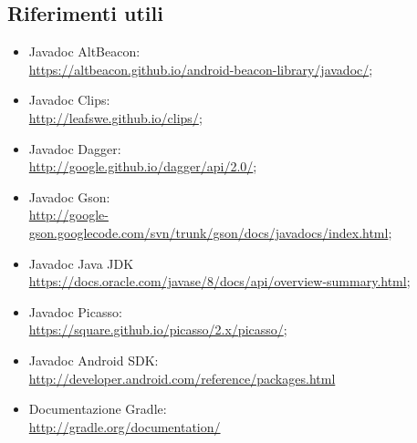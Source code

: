 \documentclass[../ManualeSviluppatore.tex]{subfiles}
\begin{document}
	
	\subsection{Riferimenti utili}
		\begin{itemize}
			\item Javadoc AltBeacon: \\ \url{https://altbeacon.github.io/android-beacon-library/javadoc/};
			\item Javadoc Clips: \\ \url{http://leafswe.github.io/clips/};
			\item Javadoc Dagger: \\ \url{http://google.github.io/dagger/api/2.0/};
			\item Javadoc Gson: \\ \url{http://google-gson.googlecode.com/svn/trunk/gson/docs/javadocs/index.html};
			\item Javadoc Java JDK \\ \url{https://docs.oracle.com/javase/8/docs/api/overview-summary.html};
			\item Javadoc Picasso: \\ \url{https://square.github.io/picasso/2.x/picasso/};
			\item Javadoc Android SDK: \\ \url{http://developer.android.com/reference/packages.html}

			\item Documentazione Gradle: \\ \url{http://gradle.org/documentation/}			

		\end{itemize}
\end{document}
